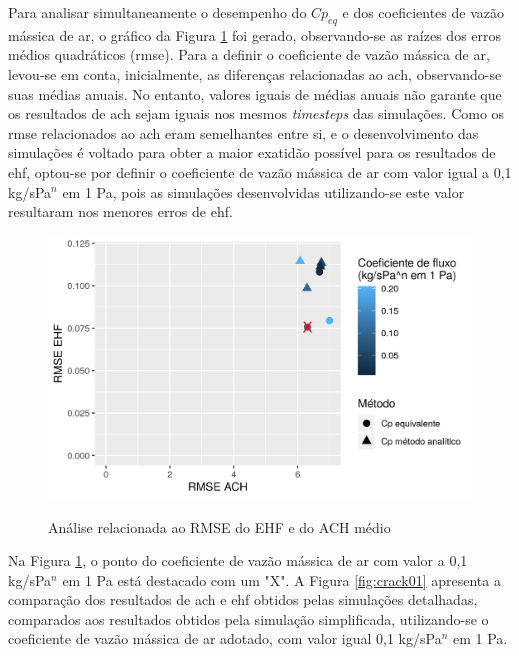 \documentclass[brazil,hardcopy,openany]{ufscthesis} %
\begin{document}
Para analisar simultaneamente o desempenho do $Cp_{eq}$ e dos coeficientes de vazão mássica de ar, o gráfico da Figura \ref{fig:pareto} foi gerado, observando-se as raízes dos erros médios quadráticos (\acrshort{rmse}).
Para a definir o coeficiente de vazão mássica de ar, levou-se em conta, inicialmente, as diferenças relacionadas ao \acrshort{ach}, observando-se suas médias anuais.
No entanto, valores iguais de médias anuais não garante que os resultados de \acrshort{ach} sejam iguais nos mesmos \textit{timesteps} das simulações. Como os \acrshort{rmse} relacionados ao \acrshort{ach} eram semelhantes entre si, e o desenvolvimento das simulações é voltado para obter a maior exatidão possível para os resultados de \acrshort{ehf}, optou-se por definir o coeficiente de vazão mássica de ar com valor igual a 0,1 kg/sPa$^n$ em 1 Pa, pois as simulações desenvolvidas utilizando-se este valor resultaram nos menores erros de \acrshort{ehf}.

\begin{figure}[h]
	\centering
	\caption{Análise relacionada ao RMSE do EHF e do ACH médio}
	\includegraphics[width=1\linewidth]{img/cpeq_pareto_fixed.png}
	\label{fig:pareto}
\end{figure}

Na Figura \ref{fig:pareto}, o ponto do coeficiente de vazão mássica de ar com valor a 0,1 kg/sPa$^n$ em 1 Pa está destacado com um "X".
A Figura \ref{fig:crack01} apresenta a comparação dos resultados de \acrshort{ach} e \acrshort{ehf} obtidos pelas simulações detalhadas, comparados aos resultados obtidos pela simulação simplificada, utilizando-se o coeficiente de vazão mássica de ar adotado, com valor igual 0,1 kg/sPa$^n$ em 1 Pa.
\end{document}
